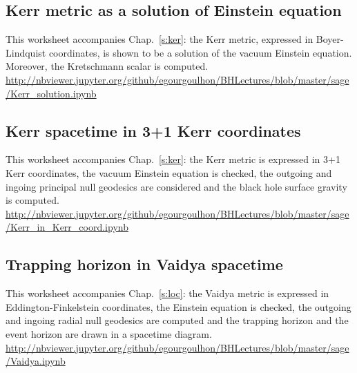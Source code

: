 \subsection{Kerr metric as a solution of Einstein equation} \label{s:sam:Kerr_solution}

This worksheet accompanies Chap.~\ref{s:ker}: the Kerr metric, expressed in Boyer-Lindquist
coordinates, is shown to be a solution of the vacuum Einstein equation. Moreover, the Kretschmann scalar is computed.\\[1ex]
{\footnotesize
\url{http://nbviewer.jupyter.org/github/egourgoulhon/BHLectures/blob/master/sage/Kerr_solution.ipynb}
}

\subsection{Kerr spacetime in 3+1 Kerr coordinates} \label{s:sam:Kerr_Kerr_coord}

This worksheet accompanies Chap.~\ref{s:ker}: the Kerr metric is expressed in 3+1 Kerr coordinates, the vacuum Einstein equation is checked, the outgoing and ingoing principal null geodesics are considered and the black hole surface gravity is computed.\\[1ex]
{\footnotesize
\url{http://nbviewer.jupyter.org/github/egourgoulhon/BHLectures/blob/master/sage/Kerr_in_Kerr_coord.ipynb}
}

\subsection{Trapping horizon in Vaidya spacetime} \label{s:sam:Vaidya_trapping}

This worksheet accompanies Chap.~\ref{s:loc}: the Vaidya metric is expressed in  Eddington-Finkelstein coordinates, the Einstein equation is checked, the outgoing and ingoing radial null geodesics are computed and the trapping horizon and the event
horizon are drawn in a spacetime diagram. \\[1ex]
{\footnotesize
\url{http://nbviewer.jupyter.org/github/egourgoulhon/BHLectures/blob/master/sage/Vaidya.ipynb}
}
